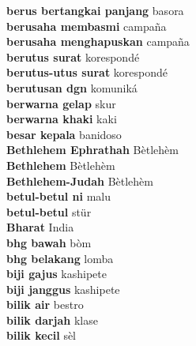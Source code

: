 \textbf{ berus bertangkai panjang  } basora \\
\textbf{ berusaha membasmi  } campaña \\
\textbf{ berusaha menghapuskan  } campaña \\
\textbf{ berutus surat  } korespondé \\
\textbf{ berutus-utus surat  } korespondé \\
\textbf{ berutusan dgn  } komuniká \\
\textbf{ berwarna gelap  } skur \\
\textbf{ berwarna khaki  } kaki \\
\textbf{ besar kepala  } banidoso \\
\textbf{ Bethlehem Ephrathah  } Bètlehèm \\
\textbf{ Bethlehem  } Bètlehèm \\
\textbf{ Bethlehem-Judah  } Bètlehèm \\
\textbf{ betul-betul ni  } malu \\
\textbf{ betul-betul  } stür \\
\textbf{ Bharat  } India \\
\textbf{ bhg bawah  } bòm \\
\textbf{ bhg belakang  } lomba \\
\textbf{ biji gajus  } kashipete \\
\textbf{ biji janggus  } kashipete \\
\textbf{ bilik air  } bestro \\
\textbf{ bilik darjah  } klase \\
\textbf{ bilik kecil  } sèl \\
